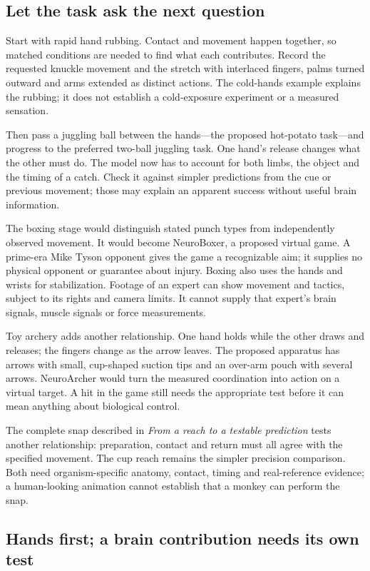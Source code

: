 \subsection{Let the task ask the next question}

Start with rapid hand rubbing. Contact and movement happen together, so matched
conditions are needed to find what each contributes. Record the requested
knuckle movement and the stretch with interlaced fingers, palms turned outward
and arms extended as distinct actions. The cold-hands example explains the
rubbing; it does not establish a cold-exposure experiment or a measured sensation.

Then pass a juggling ball between the hands---the proposed hot-potato task---and
progress to the preferred two-ball juggling task. One hand's release changes what
the other must do. The model now has to account for both limbs, the object and
the timing of a catch. Check it against simpler predictions from the cue or
previous movement; those may explain an apparent success without useful brain
information.

The boxing stage would distinguish stated punch types from independently
observed movement. It would become NeuroBoxer, a proposed virtual game. A
prime-era Mike Tyson opponent gives the game a recognizable aim; it supplies no
physical opponent or guarantee about injury. Boxing also uses the hands and
wrists for stabilization. Footage of an expert can show movement and tactics,
subject to its rights and camera limits. It cannot supply that expert's brain
signals, muscle signals or force measurements.

Toy archery adds another relationship. One hand holds while the other draws and
releases; the fingers change as the arrow leaves. The proposed apparatus has
arrows with small, cup-shaped suction tips and an over-arm pouch with several
arrows. NeuroArcher would turn the measured
coordination into action on a virtual target. A hit in the game still needs the
appropriate test before it can mean anything about biological control.

The complete snap described in \emph{From a reach to a testable prediction} tests another
relationship: preparation, contact and return must all agree with the specified
movement. The cup reach remains the simpler precision comparison. Both need
organism-specific anatomy, contact, timing and real-reference evidence; a
human-looking animation cannot establish that a monkey can perform the snap.

\subsection{Hands first; a brain contribution needs its own test}

